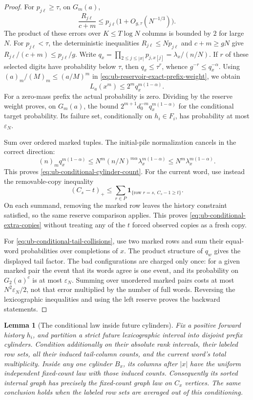 \documentclass[11pt]{article}
\numberwithin{equation}{section}
\newtheorem{lemma}[lemma]{Lemma}
\newcommand{\1}{\mathbf 1}
\begin{document}
\begin{proof}
For \(p_{j\ell}\ge\tau\), on \(G_m(a)\),
\[
 \frac{R_{j\ell}}{c+m}
 \le p_{j\ell}\bigl(1+O_{g,\tau}(N^{-1/3})\bigr).
\]
The product of these errors over \(K\le T\log N\) columns is
bounded by \(2\) for large \(N\). For \(p_{j\ell}<\tau\),
the deterministic inequalities \(R_{j\ell}\le Np_{j\ell}\) and
\(c+m\ge gN\) give \(R_{j\ell}/(c+m)\le p_{j\ell}/g\).
Write
\(q_x=\prod_{2\le j\le |x|}p_{j,x[j]}=\lambda_x/(n/N)\).
If \(r\) of these selected digits have probability below \(\tau\),
then \(q_x\le\tau^r\), whence \(g^{-r}\le q_x^{-\alpha}\).
Using \((a)_m/(M)_m\le(a/M)^m\) in
\eqref{eq:ub-reservoir-exact-prefix-weight}, we obtain
\[
 L_a(x^m)\le2^m q_x^{m(1-\alpha)}.
\]
For a zero-mass prefix the actual probability is zero. Dividing by
the reserve weight proves, on \(G_m(a)\), the bound
\(2^{m+1}d_0^{-m}q_x^{m(1-\alpha)}\) for the conditional target
probability. Its failure set, conditionally on \(h_i\in F_i\),
has probability at most \(\varepsilon_N\).

Sum over ordered marked tuples. The initial-pile normalization
cancels in the correct direction:
\[
 (n)_m q_x^{m(1-\alpha)}
 \le N^m(n/N)^{m\alpha}\lambda_x^{m(1-\alpha)}
 \le N^m\lambda_x^{m(1-\alpha)}.
\]
This proves \eqref{eq:ub-conditional-cylinder-count}. For the
current word, use instead the removable-copy inequality
\[
 (C_s-t)_+
 \le\sum_{r\in P}\1_{\{\text{row }r=s,\ C_s-1\ge t\}}.
\]
On each summand, removing the marked row leaves the history
constraint satisfied, so the same reserve comparison applies.
This proves \eqref{eq:ub-conditional-extra-copies} without
treating any of the \(t\) forced observed copies as a fresh copy.

For \eqref{eq:ub-conditional-tail-collisions}, use two marked rows
and sum their equal-word probabilities over completions of \(x\).
The product structure of \(q_w\) gives the displayed tail factor.
The bad configurations are charged only once: for a given marked
pair the event that its words agree is one event, and its probability
on \(G_2(a)^c\) is at most \(\varepsilon_N\). Summing over
unordered marked pairs costs at most \(N^2\varepsilon_N/2\),
not that error multiplied by the number of full words. Reversing
the lexicographic inequalities and using the left reserve proves
the backward statements.
\end{proof}

\begin{lemma}[The conditional law inside future cylinders]
\label{lem:ub-exact-conditional-block-law}
Fix a positive forward history \(h_i\), and partition a strict
future lexicographic interval into disjoint prefix cylinders.
Condition additionally on their absolute rank intervals, their
labeled row sets, all their induced tail-column counts, and the
current word's total multiplicity. Inside any one cylinder \(B_x\),
its columns after \(|x|\) have the uniform independent fixed-count
law with those induced counts. Consequently its sorted internal
graph has precisely the fixed-count graph law on \(C_x\) vertices.
The same conclusion holds when the labeled row sets are averaged
out of this conditioning.
\end{lemma}
\end{document}
